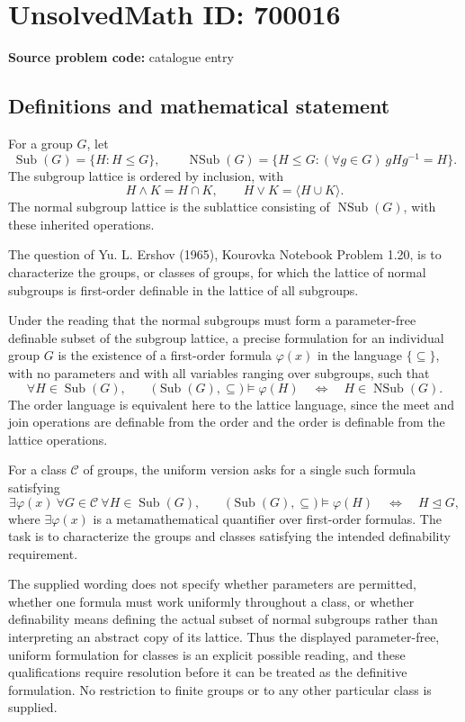 \documentclass[11pt]{article}
\begin{document}
\section*{UnsolvedMath ID: 700016}
\textbf{Source problem code:} catalogue entry
\subsection{Definitions and mathematical statement}
For a group \(G\), let
\[
\operatorname{Sub}(G)=\{H:H\leq G\},\qquad
\operatorname{NSub}(G)=\{H\leq G:(\forall g\in G)\ gHg^{-1}=H\}.
\]
The subgroup lattice is ordered by inclusion, with
\[
H\wedge K=H\cap K,\qquad H\vee K=\langle H\cup K\rangle.
\]
The normal subgroup lattice is the sublattice consisting of \(\operatorname{NSub}(G)\), with these inherited operations.

The question of Yu. L. Ershov (1965), Kourovka Notebook Problem 1.20, is to characterize the groups, or classes of groups, for which the lattice of normal subgroups is first-order definable in the lattice of all subgroups.

Under the reading that the normal subgroups must form a parameter-free definable subset of the subgroup lattice, a precise formulation for an individual group \(G\) is the existence of a first-order formula \(\varphi(x)\) in the language \(\{\subseteq\}\), with no parameters and with all variables ranging over subgroups, such that
\[
\forall H\in\operatorname{Sub}(G),\qquad
\bigl(\operatorname{Sub}(G),\subseteq\bigr)\models\varphi(H)
\quad\Longleftrightarrow\quad H\in\operatorname{NSub}(G).
\]
The order language is equivalent here to the lattice language, since the meet and join operations are definable from the order and the order is definable from the lattice operations.

For a class \(\mathcal C\) of groups, the uniform version asks for a single such formula satisfying
\[
\exists\varphi(x)\ \forall G\in\mathcal C\ \forall H\in\operatorname{Sub}(G),\qquad
\bigl(\operatorname{Sub}(G),\subseteq\bigr)\models\varphi(H)
\quad\Longleftrightarrow\quad H\trianglelefteq G,
\]
where \(\exists\varphi(x)\) is a metamathematical quantifier over first-order formulas. The task is to characterize the groups and classes satisfying the intended definability requirement.

The supplied wording does not specify whether parameters are permitted, whether one formula must work uniformly throughout a class, or whether definability means defining the actual subset of normal subgroups rather than interpreting an abstract copy of its lattice. Thus the displayed parameter-free, uniform formulation for classes is an explicit possible reading, and these qualifications require resolution before it can be treated as the definitive formulation. No restriction to finite groups or to any other particular class is supplied.
\end{document}
